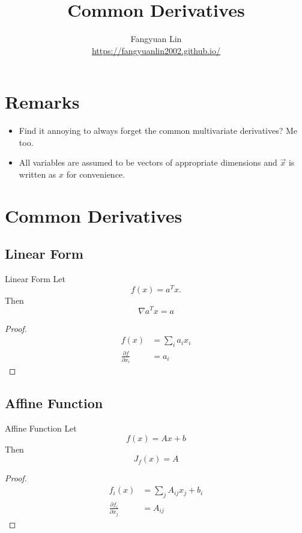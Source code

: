 \documentclass[../main]{subfiles}
\title{Common Derivatives}
\author{Fangyuan Lin\\
\hyperref[website]{https://fangyuanlin2002.github.io/}}
\date{}
\begin{document}
\maketitle
\tableofcontents
\section{Remarks}
\begin{itemize}
    \item Find it annoying to always forget the common multivariate derivatives? Me too.
    \item All variables are assumed to be vectors of appropriate dimensions and $\vec x$ is written as $x$ for convenience. 
\end{itemize}
\section{Common Derivatives}

\subsection{Linear Form}
\begin{bbox}{Linear Form}
    Let 
    \[
    f(x) = a^T x.
    \]
    Then
    \[
    \nabla a^T x = a
    \]

    \begin{proof}
        \begin{align*}
            f(x) &= \sum_i a_i x_i\\
            \frac{\partial f}{\partial x_i}&=a_i
        \end{align*}
    \end{proof}
\end{bbox}

\subsection{Affine Function}
\begin{bbox}{Affine Function}
    Let 
    \[
    f(x) = Ax + b
    \]
    Then 
    \[
    J_f(x) = A
    \]
    \begin{proof}
        \begin{align*}
            f_i(x) &= \sum_jA_{ij}x_j + b_i\\
            \frac{\partial f_i}{\partial x_j} &= A_{ij}
        \end{align*}
    \end{proof}
\end{bbox}
\end{document}
